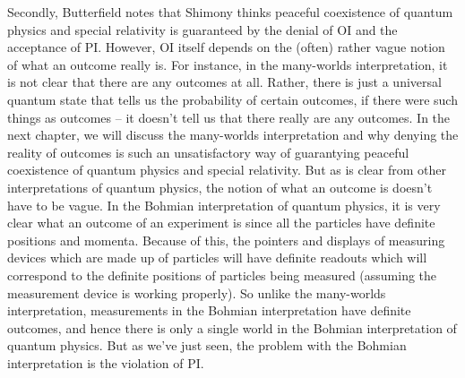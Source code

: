 Secondly,  Butterfield notes that Shimony thinks peaceful coexistence of quantum physics and special relativity is guaranteed by the denial of OI and the acceptance of PI. However, OI itself depends on the (often) rather vague notion of what an outcome really is. For instance, in the many-worlds interpretation, it is not clear that there are any outcomes at all. Rather, there is just a universal quantum state that tells us the probability of certain outcomes, if there were such things as outcomes -- it doesn't tell us that there really are any outcomes. In the next chapter, we will discuss the many-worlds interpretation and why denying the reality of outcomes is such an unsatisfactory way of guarantying peaceful coexistence of quantum physics and special relativity. But as is clear from other interpretations of quantum physics, the notion of what an outcome is doesn't have to be vague. In the Bohmian interpretation of quantum physics, it is very clear what an outcome of an experiment is since all the particles have definite positions and momenta. Because of this, the pointers and displays of measuring devices which are made up of particles will have definite readouts which will correspond to the definite positions of particles being measured (assuming the measurement device is working properly). So unlike the many-worlds interpretation, measurements in the Bohmian interpretation have definite outcomes, and hence there is only a single world in the Bohmian interpretation of quantum physics. But as we've just seen, the problem with the Bohmian interpretation is the violation of PI.

